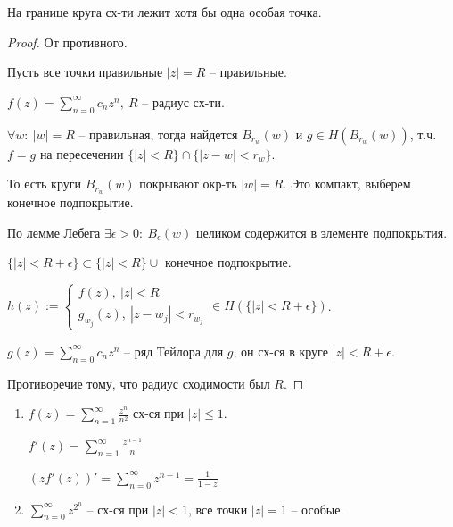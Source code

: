 \begin{theorem}
    На границе круга сх-ти лежит хотя бы одна особая точка.
\end{theorem}
\begin{proof}
    От противного. 

    Пусть все точки правильные $|z| = R$ -- правильные.

    $f(z) = \sum_{n=0}^{\infty} { c_n z^n }, \ R$ -- радиус сх-ти.

    $\forall w: \ |w| = R$ -- правильная, тогда найдется $B_{r_w} (w)$ и $g \in H(B_{r_w} (w))$, т.ч. $f = g$ на пересечении $\{ |z| < R \} \cap \{ |z - w| < r_w \}$.

    То есть круги $B_{r_w}(w)$ покрывают окр-ть $|w| = R$. Это компакт, выберем конечное подпокрытие. 


    По лемме Лебега $\exists \epsilon > 0: \ B_{\epsilon} (w)$ целиком содержится в элементе подпокрытия.

    $\{ |z| < R + \epsilon \} \subset \{ |z| < R \} \cup$ конечное подпокрытие. 

    $h(z) := \begin{cases}
        f(z), \ |z| < R \\ 
        g_{w_j} (z), \ |z - w_j| < r_{w_j}
    \end{cases} \in H(\{ |z| < R + \epsilon \})$.

    $g(z) = \sum_{n=0}^{\infty} { c_n z^n }$ -- ряд Тейлора для $g$, он сх-ся в круге $|z| < R + \epsilon$.

    Противоречие тому, что радиус сходимости был $R$.
\end{proof}

\begin{example}
    \begin{enumerate}
        \item {
            $f(z) = \sum_{n=1}^{\infty} { \frac{z^n}{n^2} }$ сх-ся при $|z| \leq 1$.

            $f'(z) = \sum_{n=1}^{\infty} { \frac{z^{n-1}}{n} }$

            $(zf'(z))' = \sum_{n=0}^{\infty} { z^{n-1} } = \frac{1}{1-z}$
        }
        \item {
            $\sum_{n=0}^{\infty} { z^{2^n} }$ -- сх-ся при $|z| < 1$, все точки $|z| = 1$ -- особые. 
        }
    \end{enumerate}
\end{example}


